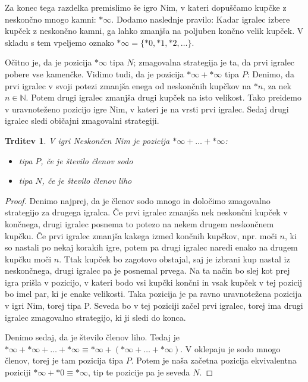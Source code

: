 \documentclass[a4paper, 10pt]{article}
\newtheorem{trd}{Trditev}
\newcommand{\mth}[1]{\ensuremath{\mathbb{#1}}}
\newcommand{\N}{\mth{N}}
\begin{document}
	Za konec tega razdelka premislimo še igro Nim, v kateri dopuščamo kupčke z neskončno mnogo kamni: $*\infty$. Dodamo naslednje pravilo: Kadar igralec izbere kupček z neskončno kamni, ga lahko zmanjša na poljuben končno velik kupček. V skladu s tem vpeljemo oznako $*\infty = \{*0, *1, *2, \ldots\}$.
	
	Očitno je, da je pozicija $*\infty$ tipa $N$; zmagovalna strategija je ta, da prvi igralec pobere vse kamenčke. Vidimo tudi, da je pozicija $*\infty + *\infty$ tipa $P$: Denimo, da prvi igralec v svoji potezi zmanjša enega od neskončnih kupčkov na $*n$, za nek $n\in\N$. Potem drugi igralec zmanjša drugi kupček na isto velikost. Tako preidemo v uravnoteženo pozicijo igre Nim, v kateri je na vrsti prvi igralec. Sedaj drugi igralec sledi običajni zmagovalni strategiji. 
	
	\begin{trd}
		V igri Neskončen Nim je pozicija $*\infty + \ldots + *\infty$:\begin{itemize}
			\item tipa $P$, če je število členov sodo
			\item tipa $N$, če je število členov liho
		\end{itemize}
	\end{trd}
	\begin{proof}
		Denimo najprej, da je členov sodo mnogo in določimo zmagovalno strategijo za drugega igralca. Če prvi igralec zmanjša nek neskončni kupček v končnega, drugi igralec posnema to potezo na nekem drugem neskončnem kupčku. Če prvi igralec zmanjša kakega izmed končnih kupčkov, npr. moči $n$, ki so nastali po nekaj korakih igre, potem pa drugi igralec naredi enako na drugem kupčku moči $n$. Ttak kupček bo zagotovo obstajal, saj je izbrani kup nastal iz neskončnega, drugi igralec pa je posnemal prvega. Na ta način bo slej kot prej igra prišla v pozicijo, v kateri bodo vsi kupčki končni in vsak kupček v tej pozicij bo imel par, ki je enake velikosti. Taka pozicija je pa ravno uravnotežena pozicija v igri Nim, torej tipa P. Seveda bo v tej poziciji začel prvi igralec, torej ima drugi igralec zmagovalno strategijo, ki ji sledi do konca.
		
		Denimo sedaj, da je število členov liho. Tedaj je $*\infty + *\infty + \ldots + *\infty \equiv *\infty + (*\infty + \ldots + *\infty)$. V oklepaju je sodo mnogo členov, torej je tam pozicija tipa $P$. Potem je naša začetna pozicija ekvivalentna poziciji $*\infty + *0 \equiv *\infty$, tip te pozicije pa je seveda $N$.	
	\end{proof}
	
\end{document}
